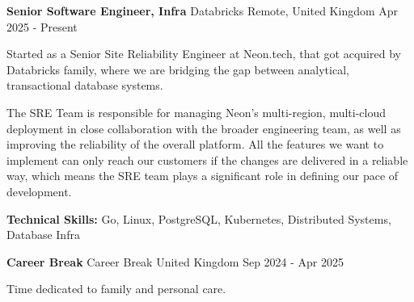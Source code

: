

\begin{cventries}

	\cventry
	{\textbf{Senior Software Engineer, Infra}} %
	{Databricks} %
	{Remote, United Kingdom} %
	{Apr 2025 - Present} %
	{
		\begin{cvitems} %
			\item{Started as a Senior Site Reliability Engineer
						at Neon.tech, that got acquired by Databricks family, where we are bridging the gap between
						analytical, transactional database systems.}
			\item {The SRE Team is responsible for managing Neon’s multi-region, multi-cloud deployment in close
			            collaboration with the broader engineering team, as well as improving the reliability of the overall
			            platform. All the features we want to implement can only reach our customers if the changes are
			            delivered in a reliable way, which means the SRE team plays a significant role in defining our pace of
			            development.}
			\item {\textbf{Technical Skills:} Go, Linux, PostgreSQL, Kubernetes, Distributed Systems, Database Infra}
		\end{cvitems}
	}

	\cventry
	{\textbf{Career Break}} %
	{Career Break} %
	{United Kingdom} %
	{Sep 2024 - Apr 2025} %
	{
		\begin{cvitems} %
			\item {Time dedicated to family and personal care.}
		\end{cvitems}
	}


\end{cventries}

